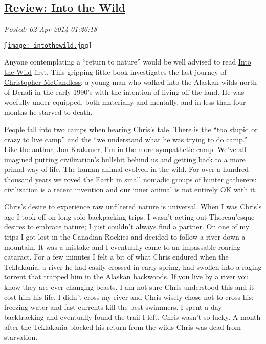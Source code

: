 %

\subsection*{\href{http://bakerjd99.wordpress.com/2014/04/01/review-into-the-wild/}{Review: Into the Wild}}


\noindent\emph{Posted: 02 Apr 2014 01:26:18}
\vspace{6pt}


\captionsetup[floatingfigure]{labelformat=empty}
\begin{floatingfigure}[l]{0.25\textwidth}
\centering
\href{http://www.goodreads.com/book/show/1845.Into\_the\_Wild}{\texttt{[image: intothewild.jpg]}}
\label{fig:4604X0}
\end{floatingfigure} Anyone
contemplating a ``return to nature'' would be well advised to read
\href{http://www.amazon.com/Into-Wild-Jon-Krakauer/dp/0385486804}{Into
the Wild} first. This gripping little book investigates the last journey
of
\href{http://en.wikipedia.org/wiki/Christopher\_McCandless}{Christopher
McCandless}: a young man who walked into the Alaskan wilds north of
Denali in the early 1990's with the intention of living off the land. He
was woefully under-equipped, both materially and mentally, and in less
than four months he starved to death.

People fall into two camps when hearing Chris's tale. There is the ``too
stupid or crazy to live camp'' and the ``we understand what he was
trying to do camp.'' Like the author, Jon Krakauer, I'm in the more
sympathetic camp. We've all imagined putting civilization's bullshit
behind us and getting back to a more primal way of life. The human
animal evolved in the wild. For over a hundred thousand years we roved
the Earth in small nomadic groups of hunter gatherers: civilization is a
recent invention and our inner animal is not entirely OK with it.

Chris's desire to experience raw unfiltered nature is universal. When I
was Chris's age I took off on long solo backpacking trips. I wasn't
acting out Thoreau'esque desires to embrace nature; I just couldn't
always find a partner. On one of my trips I got lost in the Canadian
Rockies and decided to follow a river down a mountain. It was a mistake
and I eventually came to an impassable roaring cataract. For a few
minutes I felt a bit of what Chris endured when the Teklakania, a river
he had easily crossed in early spring, had swollen into a raging torrent
that trapped him in the Alaskan backwoods. If you live by a river you
know they are ever-changing beasts. I am not sure Chris understood this
and it cost him his life. I didn't cross my river and Chris wisely chose
not to cross his: freezing water and fast currents kill the best
swimmers. I spent a day backtracking and eventually found the trail I
left. Chris wasn't so lucky. A month after the Teklakania blocked his
return from the wilds Chris was dead from starvation.

